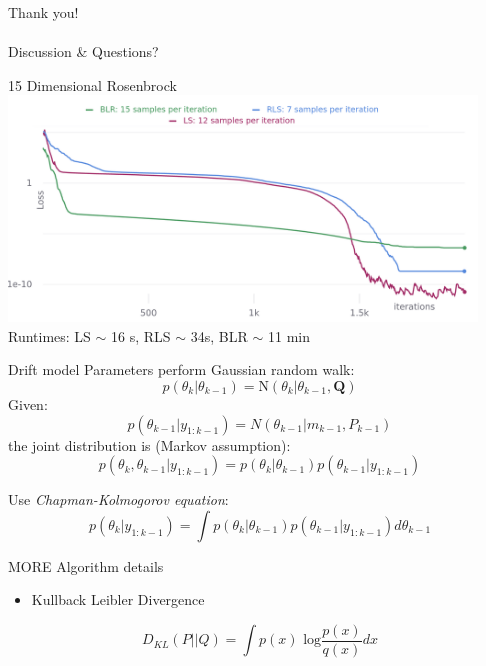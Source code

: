 \documentclass[navbarinfooter, 12pt]{sdqbeamer}
\begin{document}
\begin{frame}{}
  \centering
  \huge
  Thank you! \\
  $ $ \\
  Discussion \& Questions?
\end{frame}

\appendix
\beginbackup

\begin{frame}{15 Dimensional Rosenbrock}
  \centering
  \includegraphics[height=6cm]{figures/iterations_all_dim15.png} \\
  Runtimes: LS $\sim$ 16 s, RLS $\sim$ 34s, BLR $\sim$ 11 min
  
\end{frame}


\begin{frame}{Drift model}
  Parameters perform Gaussian random walk:
  $$ p(\theta_k | \theta_{k-1}) = \text{N}(\theta_k | \theta_{k-1}, \textbf{Q}) $$ 
  Given:
$$ p(\theta_{k-1} | y_{1:k-1}) = N(\theta_{k-1} | m_{k-1}, P_{k-1})$$
  the joint distribution is (Markov assumption):
$$ p(\theta_k, \theta_{k-1} | y_{1:k-1}) = p(\theta_k | \theta_{k-1}) p(\theta_{k-1} | y_{1:k-1})$$

Use \textit{Chapman-Kolmogorov equation}:
$$ p(\theta_k | y_{1:k-1}) = \int p(\theta_k | \theta_{k-1}) p(\theta_{k-1} | y_{1:k-1}) d\theta_{k-1} $$
\end{frame}

\begin{frame}{MORE Algorithm details}
\begin{itemize}
\item Kullback Leibler Divergence
\end{itemize}
$$ D_{KL}(P||Q) = \int p(x) \text{ log} \frac{p(x)}{q(x)} dx $$
\end{frame}
\end{document}
